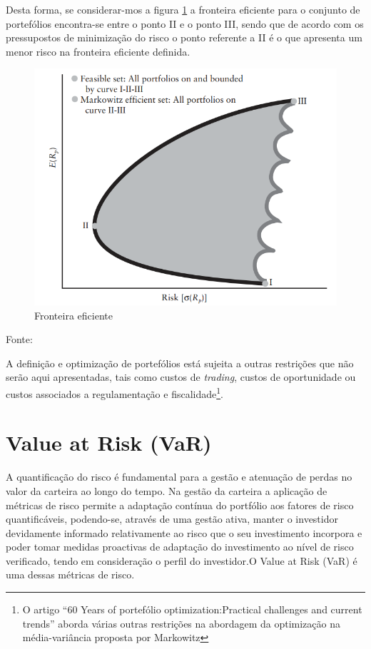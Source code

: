 \documentclass[
  12pt,
  a4paper,
  openany]{book}
\theoremstyle{definition}
\theoremstyle{definition}
\theoremstyle{definition}
\theoremstyle{remark}
\begin{document}
Desta forma, se considerar-mos a figura \ref{fig:eficient} a fronteira eficiente para o conjunto de portefólios encontra-se entre o ponto II e o ponto III, sendo que de acordo com os pressupostos de minimização do risco o ponto referente a II é o que apresenta um menor risco na fronteira eficiente definida.



\begin{figure}

{\centering \includegraphics[width=0.6\linewidth]{image/eficient} 

}

\caption{Fronteira eficiente}\label{fig:eficient}
\end{figure}
\FloatBarrier
\centering

Fonte: \citep[p.33]{invest}

\justifying
\medskip

A definição e optimização de portefólios está sujeita a outras restrições que não serão aqui apresentadas, tais como custos de \emph{trading}, custos de oportunidade ou custos associados a regulamentação e fiscalidade\footnote{O artigo \citet{Fabozzi2014} ``60 Years of portefólio optimization:Practical challenges and current trends'' aborda várias outras restrições na abordagem da optimização na média-variância proposta por Markowitz}.

\hypertarget{value-at-risk-var}{%
\section{Value at Risk (VaR)}\label{value-at-risk-var}}

A quantificação do risco é fundamental para a gestão e atenuação de perdas no valor da carteira ao longo do tempo. Na gestão da carteira a aplicação de métricas de risco permite a adaptação contínua do portfólio aos fatores de risco quantificáveis, podendo-se, através de uma gestão ativa, manter o investidor devidamente informado relativamente ao risco que o seu investimento incorpora e poder tomar medidas proactivas de adaptação do investimento ao nível de risco verificado, tendo em consideração o perfil do investidor.O Value at Risk (VaR) é uma dessas métricas de risco.
\end{document}
